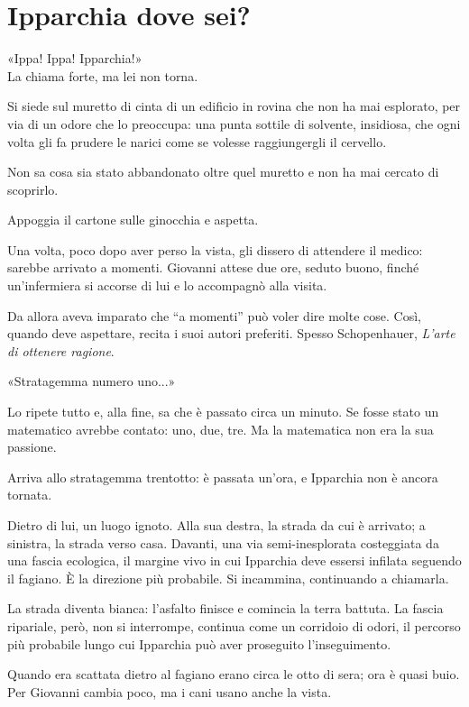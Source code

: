 \chapter{Ipparchia dove sei?}

«Ippa! Ippa! Ipparchia!»\\
La chiama forte, ma lei non torna.

Si siede sul muretto di cinta di un edificio in rovina che non ha mai esplorato, per via di un odore che lo preoccupa: una punta sottile di solvente, insidiosa, che ogni volta gli fa prudere le narici come se volesse raggiungergli il cervello.

Non sa cosa sia stato abbandonato oltre quel muretto e non ha mai cercato di scoprirlo.

Appoggia il cartone sulle ginocchia e aspetta.

Una volta, poco dopo aver perso la vista, gli dissero di attendere il medico: sarebbe arrivato a momenti. Giovanni attese due ore, seduto buono, finch\'e un’infermiera si accorse di lui e lo accompagnò alla visita.

Da allora aveva imparato che “a momenti” pu\`o voler dire molte cose. Così, quando deve aspettare, recita i suoi autori preferiti. Spesso Schopenhauer, \textit{L’arte di ottenere ragione}.

«Stratagemma numero uno...»

Lo ripete tutto e, alla fine, sa che \`e passato circa un minuto. Se fosse stato un matematico avrebbe contato: uno, due, tre. Ma la matematica non era la sua passione.

Arriva allo stratagemma trentotto: \`e passata un’ora, e Ipparchia non \`e ancora tornata.

Dietro di lui, un luogo ignoto. Alla sua destra, la strada da cui \`e arrivato; a sinistra, la strada verso casa. Davanti, una via semi-inesplorata costeggiata da una fascia ecologica, il  margine vivo in cui Ipparchia deve essersi infilata seguendo il fagiano. \`E la direzione pi\`u probabile.
Si incammina, continuando a chiamarla.

La strada diventa bianca: l’asfalto finisce e comincia la terra battuta. La fascia ripariale, per\`o, non si interrompe, continua  come un corridoio di odori, il percorso pi\`u probabile lungo cui Ipparchia pu\`o aver proseguito l’inseguimento.

Quando era scattata dietro al fagiano erano circa le otto di sera; ora \`e quasi buio. Per Giovanni cambia poco, ma i cani usano anche la vista.


